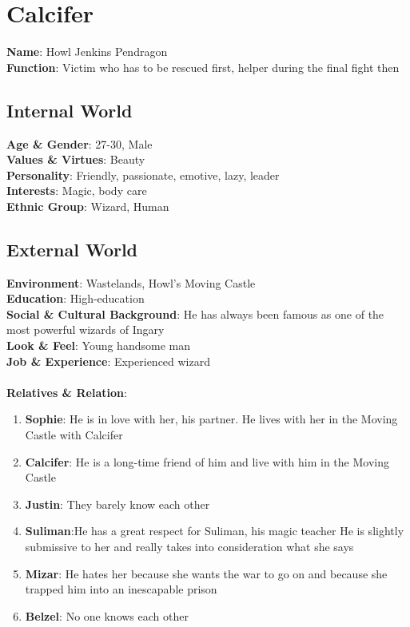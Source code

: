 \section{Calcifer}

\textbf{Name}: Howl Jenkins Pendragon \\
\textbf{Function}: Victim who has to be rescued first, helper during the final fight then

\subsection{Internal World}

\textbf{Age \& Gender}: 27-30, Male \\
\textbf{Values \& Virtues}: Beauty \\
\textbf{Personality}: Friendly, passionate, emotive, lazy, leader \\
\textbf{Interests}: Magic, body care \\
\textbf{Ethnic Group}: Wizard, Human

\subsection{External World}
\textbf{Environment}: Wastelands, Howl’s Moving Castle \\
\textbf{Education}: High-education \\
\textbf{Social \& Cultural Background}: He has always been famous as one of the most powerful wizards of Ingary \\
\textbf{Look \& Feel}: Young handsome man   \\
\textbf{Job \& Experience}: Experienced wizard \\
\\
\textbf{Relatives \& Relation}:
\begin{enumerate}
\item \textbf{Sophie}: He is in love with her, his partner. He lives with her in the Moving Castle
        with Calcifer
\item \textbf{Calcifer}: He is a long-time friend of him and live with him in the Moving Castle
\item \textbf{Justin}: They barely know each other
\item \textbf{Suliman}:He has a great respect for Suliman, his magic teacher
             He is slightly submissive to her and really takes into consideration what she says
\item \textbf{Mizar}: He hates her because she wants the war to go on and because she trapped him into an inescapable prison 
\item \textbf{Belzel}: No one knows each other
\end{enumerate}

